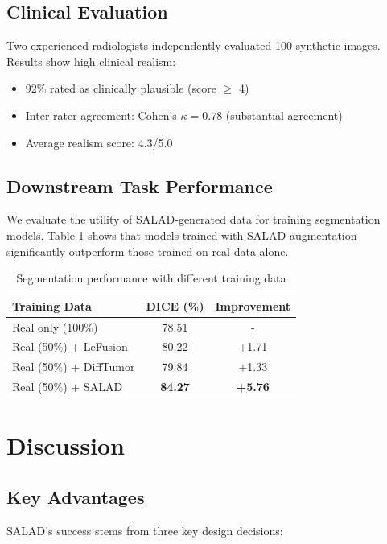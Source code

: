 \documentclass[10pt,twocolumn]{article}
\begin{document}
\subsection{Clinical Evaluation}

Two experienced radiologists independently evaluated 100 synthetic images. Results show high clinical realism:
\begin{itemize}
\item 92\% rated as clinically plausible (score $\geq$ 4)
\item Inter-rater agreement: Cohen's $\kappa = 0.78$ (substantial agreement)
\item Average realism score: 4.3/5.0
\end{itemize}

\subsection{Downstream Task Performance}

We evaluate the utility of SALAD-generated data for training segmentation models. Table \ref{tab:downstream} shows that models trained with SALAD augmentation significantly outperform those trained on real data alone.

\begin{table}[h]
\centering
\caption{Segmentation performance with different training data}
\label{tab:downstream}
\begin{tabular}{lcc}
\toprule
Training Data & DICE (\%) & Improvement \\
\midrule
Real only (100\%) & 78.51 & - \\
Real (50\%) + LeFusion & 80.22 & +1.71 \\
Real (50\%) + DiffTumor & 79.84 & +1.33 \\
Real (50\%) + SALAD & \textbf{84.27} & \textbf{+5.76} \\
\bottomrule
\end{tabular}
\end{table}

\section{Discussion}

\subsection{Key Advantages}

SALAD's success stems from three key design decisions:
\end{document}
